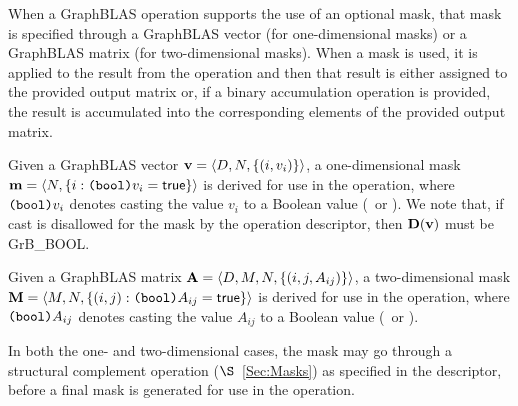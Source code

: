 %
%
When a GraphBLAS operation supports the use of an optional mask, that mask is
specified through a GraphBLAS vector (for one-dimensional masks) or
a GraphBLAS matrix (for two-dimensional masks).  When a mask is used, it is 
applied to the result from the operation and then that result is either assigned to the 
provided output matrix or, if a binary accumulation operation is provided, the result is 
accumulated into the corresponding elements of the provided output matrix.

Given a GraphBLAS vector ${\bf v} = \langle D,N, \{ (i,v_i) \} \rangle$, a
one-dimensional mask ${\bf m} = \langle N, \{ i : \mbox{\tt (bool)}v_i = {\sf true} \} \rangle$
is derived for use in the operation, where $\mbox{\tt (bool)}v_i$ denotes
casting the value $v_i$ to a Boolean value (\true\ or \false).
We note that, if cast is disallowed for the mask by the operation descriptor, then
$\bold{D}({\bf v})$ must be {\sf GrB\_BOOL}.

Given a GraphBLAS matrix ${\bf A} = \langle D, M, N, \{ (i,j,A_{ij}) \} \rangle$,
a two-dimensional mask ${\bf M} = \langle M,N, \{ (i,j) : \mbox{\tt (bool)}A_{ij} = {\sf true} \} \rangle$
is derived for use in the operation, where $\mbox{\tt (bool)}A_{ij}$ denotes
casting the value $A_{ij}$ to a Boolean value (\true\ or \false).

In both the one- and two-dimensional cases, the mask may go through a structural
complement operation ($\S$~\ref{Sec:Masks}) as specified in the descriptor, before a final
mask is generated for use in the operation.




